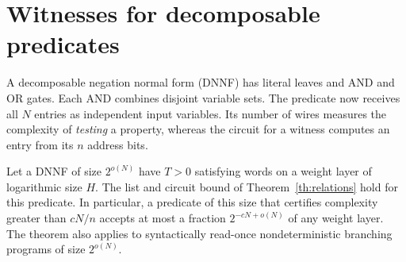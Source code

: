 \section{Witnesses for decomposable predicates}
A decomposable negation normal form (DNNF) has literal leaves and AND and OR gates. Each AND combines disjoint variable sets. The predicate now receives all $N$ entries as independent input variables. Its number of wires measures the complexity of \emph{testing} a property, whereas the circuit for a witness computes an entry from its $n$ address bits.
\begin{theorem}
Let a DNNF of size $2^{o(N)}$ have $T>0$ satisfying words on a weight layer of logarithmic size $H$. The list and circuit bound of Theorem~\ref{th:relations} hold for this predicate. In particular, a predicate of this size that certifies complexity greater than $cN/n$ accepts at most a fraction $2^{-cN+o(N)}$ of any weight layer. The theorem also applies to syntactically read-once nondeterministic branching programs of size $2^{o(N)}$.
\end{theorem}
